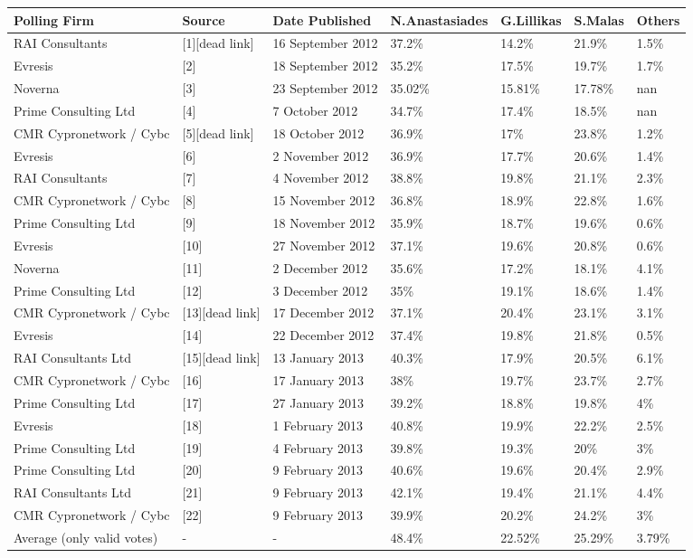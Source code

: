 \documentclass{article}
\begin{document}
\begin{tabular}{lllllll}
\toprule
Polling Firm & Source & Date Published & N.Anastasiades & G.Lillikas & S.Malas & Others \\
\midrule
RAI Consultants & [1][dead link] & 16 September 2012 & 37.2\% & 14.2\% & 21.9\% & 1.5\% \\
Evresis & [2] & 18 September 2012 & 35.2\% & 17.5\% & 19.7\% & 1.7\% \\
Noverna & [3] & 23 September 2012 & 35.02\% & 15.81\% & 17.78\% & nan \\
Prime Consulting Ltd & [4] & 7 October 2012 & 34.7\% & 17.4\% & 18.5\% & nan \\
CMR Cypronetwork / Cybc & [5][dead link] & 18 October 2012 & 36.9\% & 17\% & 23.8\% & 1.2\% \\
Evresis & [6] & 2 November 2012 & 36.9\% & 17.7\% & 20.6\% & 1.4\% \\
RAI Consultants & [7] & 4 November 2012 & 38.8\% & 19.8\% & 21.1\% & 2.3\% \\
CMR Cypronetwork / Cybc & [8] & 15 November 2012 & 36.8\% & 18.9\% & 22.8\% & 1.6\% \\
Prime Consulting Ltd & [9] & 18 November 2012 & 35.9\% & 18.7\% & 19.6\% & 0.6\% \\
Evresis & [10] & 27 November 2012 & 37.1\% & 19.6\% & 20.8\% & 0.6\% \\
Noverna & [11] & 2 December 2012 & 35.6\% & 17.2\% & 18.1\% & 4.1\% \\
Prime Consulting Ltd & [12] & 3 December 2012 & 35\% & 19.1\% & 18.6\% & 1.4\% \\
CMR Cypronetwork / Cybc & [13][dead link] & 17 December 2012 & 37.1\% & 20.4\% & 23.1\% & 3.1\% \\
Evresis & [14] & 22 December 2012 & 37.4\% & 19.8\% & 21.8\% & 0.5\% \\
RAI Consultants Ltd & [15][dead link] & 13 January 2013 & 40.3\% & 17.9\% & 20.5\% & 6.1\% \\
CMR Cypronetwork / Cybc & [16] & 17 January 2013 & 38\% & 19.7\% & 23.7\% & 2.7\% \\
Prime Consulting Ltd & [17] & 27 January 2013 & 39.2\% & 18.8\% & 19.8\% & 4\% \\
Evresis & [18] & 1 February 2013 & 40.8\% & 19.9\% & 22.2\% & 2.5\% \\
Prime Consulting Ltd & [19] & 4 February 2013 & 39.8\% & 19.3\% & 20\% & 3\% \\
Prime Consulting Ltd & [20] & 9 February 2013 & 40.6\% & 19.6\% & 20.4\% & 2.9\% \\
RAI Consultants Ltd & [21] & 9 February 2013 & 42.1\% & 19.4\% & 21.1\% & 4.4\% \\
CMR Cypronetwork / Cybc & [22] & 9 February 2013 & 39.9\% & 20.2\% & 24.2\% & 3\% \\
Average (only valid votes) & - & - & 48.4\% & 22.52\% & 25.29\% & 3.79\% \\
\bottomrule
\end{tabular}
\end{document}
